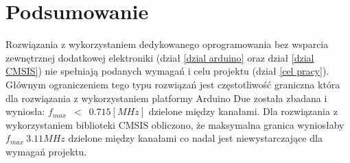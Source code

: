 
\section{Podsumowanie}

Rozwiązania z wykorzystaniem dedykowanego oprogramowania bez wsparcia zewnętrznej dodatkowej elektroniki (dział \ref{dzial arduino} oraz dział \ref{dzial CMSIS}) nie spełniają podanych wymagań i celu projektu (dział \ref{cel pracy}). Głównym ograniczeniem tego typu rozwiązań jest częstotliwość graniczna która dla rozwiązania z wykorzystaniem platformy Arduino Due została zbadana i wyniosła: $f_{max}$~$<$~$0.715 [MHz]$ dzielone między kanałami. Dla rozwiązania z wykorzystaniem biblioteki CMSIS obliczono, że maksymalna granica wyniosłaby $f_{max} ~ 3.11 MHz$ dzielone między kanałami co nadal jest niewystarczające dla wymagań projektu. 

